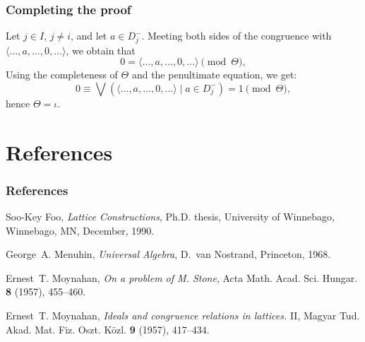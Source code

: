 \documentclass{beamer}
\begin{document}
\begin{frame}
\frametitle{Completing the proof}

Let $j \in I$, $j \neq i$, and let $a \in D_{j}^{-}$. 
Meeting both sides of the congruence 
with $\langle \ldots, a, \ldots, 0, \ldots \rangle$, 
we obtain that
\begin{equation*}
   0 = \langle \ldots, a, \ldots, 0, \ldots \rangle 
     \pmod{\Theta}, 
\end{equation*}
Using the completeness of $\Theta$ and the penultimate equation, 
we get:
\[
   0 \equiv \bigvee ( \langle \ldots, a, \ldots, 0, 
     \ldots \rangle \mid a \in D_{j}^{-} ) = 1 
     \pmod{\Theta}, 
\]
hence $\Theta = \iota$.
\end{frame}

\section{References}

\begin{frame}
\frametitle{References}

\begin{thebibliography}{9}

Soo-Key Foo, 
\emph{Lattice Constructions}, 
Ph.D. thesis, 
University of Winnebago, Winnebago, MN, December, 1990.

George~A. Menuhin, 
\emph{Universal Algebra}, 
D.~van Nostrand, Princeton, 1968.

Ernest~T. Moynahan, 
\emph{On a problem of M. Stone},
Acta Math. Acad. Sci. Hungar. \textbf{8} (1957), 
455--460.

Ernest~T. Moynahan, 
\emph{Ideals and congruence relations in lattices.} II,
Magyar Tud. Akad. Mat. Fiz. Oszt. K\"{o}zl. \textbf{9} 
(1957), 417--434.

\end{thebibliography}
\end{frame}


\end{document}
